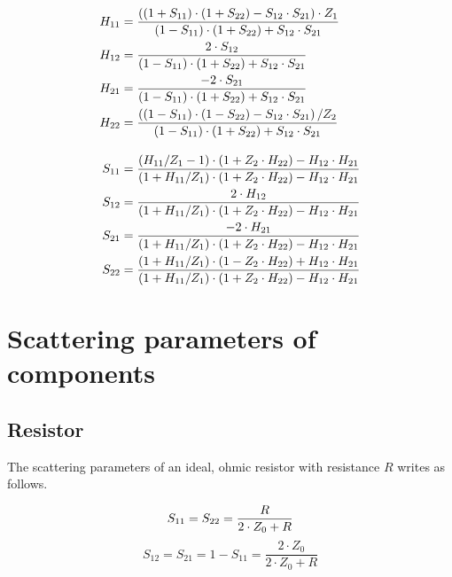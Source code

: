 \documentclass[10pt]{report}
\begin{document}
\begin{align}
H_{11} &= \dfrac{\left(\left(1 + S_{11}\right)\cdot \left(1 + S_{22}\right) - S_{12}\cdot S_{21}\right)\cdot Z_{1}}{\left(1 - S_{11}\right)\cdot \left(1 + S_{22}\right) + S_{12}\cdot S_{21}}\\
H_{12} &= \dfrac{2\cdot S_{12}}{\left(1 - S_{11}\right)\cdot \left(1 + S_{22}\right) + S_{12}\cdot S_{21}}\\
H_{21} &= \dfrac{-2\cdot S_{21}}{\left(1 - S_{11}\right)\cdot \left(1 + S_{22}\right) + S_{12}\cdot S_{21}}\\
H_{22} &= \dfrac{\left(\left(1 - S_{11}\right)\cdot \left(1 - S_{22}\right) - S_{12}\cdot S_{21}\right) / Z_{2}}{\left(1 - S_{11}\right)\cdot \left(1 + S_{22}\right) + S_{12}\cdot S_{21}}\\
\intertext{
}
S_{11} &= \dfrac{\left(H_{11} / Z_{1} - 1\right)\cdot \left(1 + Z_{2}\cdot H_{22}\right) - H_{12}\cdot H_{21}}{\left(1 + H_{11} / Z_{1}\right)\cdot \left(1 + Z_{2}\cdot H_{22}\right) - H_{12}\cdot H_{21}}\\
S_{12} &= \dfrac{2\cdot H_{12}}{\left(1 + H_{11} / Z_{1}\right)\cdot \left(1 + Z_{2}\cdot H_{22}\right) - H_{12}\cdot H_{21}}\\
S_{21} &= \dfrac{-2\cdot H_{21}}{\left(1 + H_{11} / Z_{1}\right)\cdot \left(1 + Z_{2}\cdot H_{22}\right) - H_{12}\cdot H_{21}}\\
S_{22} &= \dfrac{\left(1 + H_{11} / Z_{1}\right)\cdot \left(1 - Z_{2}\cdot H_{22}\right) + H_{12}\cdot H_{21}}{\left(1 + H_{11} / Z_{1}\right)\cdot \left(1 + Z_{2}\cdot H_{22}\right) - H_{12}\cdot H_{21}}
\end{align}

\section{Scattering parameters of components}

\subsection{Resistor}

The scattering parameters of an ideal, ohmic resistor with resistance
$R$ writes as follows.

\begin{equation}
S_{11} = S_{22} = \frac{R}{2\cdot Z_0+R} \\
\end{equation}
\begin{equation}
S_{12} = S_{21} = 1-S_{11} = \frac{2\cdot Z_0}{2\cdot Z_0+R}
\end{equation}
\end{document}
